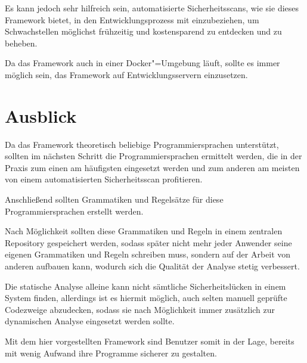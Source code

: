         Es kann jedoch sehr hilfreich sein,
        automatisierte Sicherheitsscans,
        wie sie dieses Framework bietet,
        in den Entwicklungsprozess mit einzubeziehen,
        um Schwachstellen möglichst frühzeitig und
        kostensparend zu entdecken und
        zu beheben.

        Da das Framework auch in einer Docker"=Umgebung läuft,
        sollte es immer möglich sein,
        das Framework auf Entwicklungsservern einzusetzen.

    \section{Ausblick}
        Da das Framework theoretisch beliebige Programmiersprachen unterstützt,
        sollten im nächsten Schritt die Programmiersprachen ermittelt werden,
        die in der Praxis zum einen am häufigsten eingesetzt werden und
        zum anderen am meisten von einem automatisierten Sicherheitsscan profitieren.

        Anschließend sollten Grammatiken und
        Regelsätze für diese Programmiersprachen erstellt werden.

        Nach Möglichkeit sollten diese Grammatiken und
        Regeln in einem zentralen Repository gespeichert werden,
        sodass später nicht mehr jeder Anwender seine eigenen Grammatiken und
        Regeln schreiben muss,
        sondern auf der Arbeit von anderen aufbauen kann,
        wodurch sich die Qualität der Analyse stetig verbessert.

        Die statische Analyse alleine kann nicht sämtliche Sicherheitslücken in einem System finden,
        allerdings ist es hiermit möglich,
        auch selten manuell geprüfte Codezweige abzudecken,
        sodass sie nach Möglichkeit immer zusätzlich zur dynamischen Analyse eingesetzt werden sollte.

        Mit dem hier vorgestellten Framework sind Benutzer somit in der Lage,
        bereits mit wenig Aufwand ihre Programme sicherer zu gestalten.

